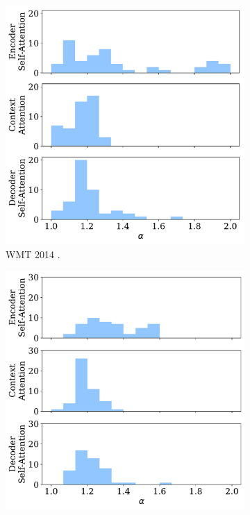 \begin{figure}[!htbp]
    \begin{subfigure}[b]{.49\linewidth}
        \includegraphics[width=\linewidth]{Figures/hist_alphas.pdf}
        \caption{%
            \label{fig:hist_alphas_en}%
            WMT 2014 .}
    \end{subfigure}
    \begin{subfigure}[b]{.49\linewidth}
        \includegraphics[width=\linewidth]{Figures/hist_alphas_de.pdf}

\end{subfigure}
\end{figure}
